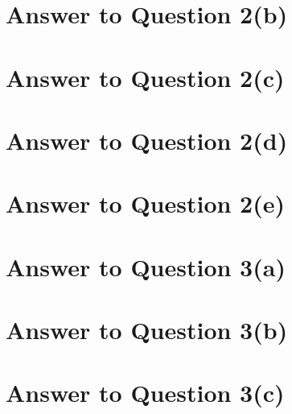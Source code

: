 \documentclass[11pt]{article}
\begin{document}
\pagebreak[4]
\section*{Answer to Question 2(b)}

\pagebreak[4]
\section*{Answer to Question 2(c)}

\pagebreak[4]
\section*{Answer to Question 2(d)}

\pagebreak[4]
\section*{Answer to Question 2(e)}

\pagebreak[4]
\section*{Answer to Question 3(a)}

\pagebreak[4]
\section*{Answer to Question 3(b)}

\pagebreak[4]
\section*{Answer to Question 3(c)}
\end{document}
